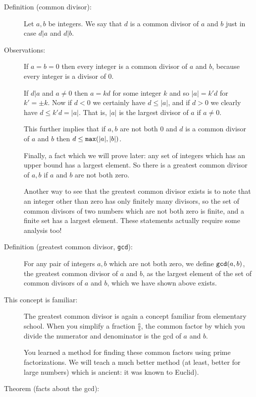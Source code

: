 \documentclass[12pt]{article}
\begin{document}
\begin{description}

\item[Definition (common divisor):]  Let $a,b$ be integers.  We say that $d$ is a common divisor of $a$ and $b$
just in case $d|a$ and $d|b$.

\item[Observations:]  If $a=b=0$ then every integer is a common divisor of $a$ and $b$, because every integer is a divisor of 0.

If $d|a$ and $a \neq 0$ then $a = kd$  for some integer $k$ and so $|a|=k'd$ for $k' = \pm k$.  Now if $d<0$ we
certainly have $d \leq |a|$, and if $d>0$ we clearly have $d \leq k'd = |a|$.  That is, $|a|$ is the largest divisor of $a$ if $a \neq 0$.

This further implies that if $a,b$ are not both 0 and $d$ is a common divisor of $a$ and $b$ then $d \leq {\tt max}(|a|,|b|)$.

Finally, a fact which we will prove later:  any set of integers which has an upper bound has a largest element.  So there
is a greatest common divisor of $a,b$ if $a$ and $b$ are not both zero.

Another way to see that the greatest common divisor exists is to note that an integer other than zero has only finitely many divisors, so the set of common divisors of two numbers which are not both zero is finite, and a finite set has a largest element.  These statements actually require some analysis too!

\item[Definition (greatest common divisor, {\tt gcd}):]  For any pair of integers $a,b$ which are not both zero,
we define ${\tt gcd}(a,b)$, the greatest common divisor of $a$ and $b$, as the largest element of the set of common divisors of $a$ and $b$, which we have shown above exists.

\item[This concept is familiar:]  The greatest common divisor is again a concept familiar from elementary school.
When you simplify a fraction $\frac ab$, the common factor by which you divide the numerator and denominator is the gcd of $a$ and $b$.

You learned a method for finding these common factors using prime factorizations.  We will teach a much better method (at least, better for large numbers) which is ancient:  it was known to Euclid).

\item[Theorem (facts about the gcd):]


\end{description}
\end{document}
